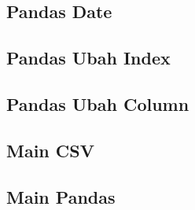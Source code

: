 \subsection{Pandas Date}

\subsection{Pandas Ubah Index}

\subsection{Pandas Ubah Column}

\subsection{Main CSV}

\subsection{Main Pandas}

